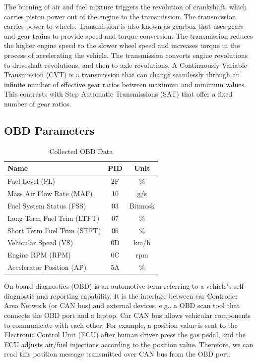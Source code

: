 The burning of air and fuel mixture triggers the revolution of 
crankshaft, which carries piston power out of the engine to the transmission.
The transmission carries power to wheels.  
Transmission is also known as gearbox that uses gears and gear trains
to provide speed and torque conversion. 
The transmission reduces the higher engine speed to the slower
wheel speed and increases torque in the process of accelerating the vehicle. 
The transmission converts engine revolutions to driveshaft revolutions, and then to axle revolutions.
A Continuously Variable Transmission (CVT) is a 
transmission that can change 
seamlessly through an infinite number of effective gear ratios 
between maximum and minimum values. 
This contrasts with Step 
Automatic Transmissions (SAT) that offer a fixed number of gear ratios.

\subsection{OBD Parameters}

\begin{table}[!htbp]
        \centering
        \caption[obd_data]{Collected OBD Data}
         \vspace{0.5cm}
        \label{obd_data}
                \begin{tabular}{|l|c|c|}
                \hline
Name & PID & Unit 
\\  \hline      \hline
Fuel Level (FL) & 2F & $\%$     
\\  \hline
Mass Air Flow Rate (MAF) & 10 & g/s   
\\   \hline
Fuel System Status (FSS) & 03  & Bitmask  
\\  \hline
Long Term Fuel Trim (LTFT) & 07  &  $\%$  
\\  \hline
Short Term Fuel Trim (STFT) & 06 &  $\%$  
\\   \hline
Vehicular Speed (VS) &  0D &  km/h   
\\  \hline
Engine RPM (RPM) & 0C & rpm 
\\   \hline
Accelerator Position (AP) & 5A & $\%$  
\\   \hline
      \end{tabular}
\end{table}


On-board diagnostics (OBD) is an automotive 
term referring to a vehicle's 
self-diagnostic and reporting capability.  
It is the interface between car Controller Area Network (or CAN bus) and external devices, 
e.g., a OBD scan tool that connects the OBD port and a laptop. 
Car CAN bus allows vehicular components to communicate with each other. 
For example, a position value is sent to 
the Electronic Control Unit (ECU) after human driver
press the gas pedal, 
and the ECU adjusts air/fuel injections according to the position value.
Therefore, we can read this position message transmitted over CAN bus 
from the OBD port. 





